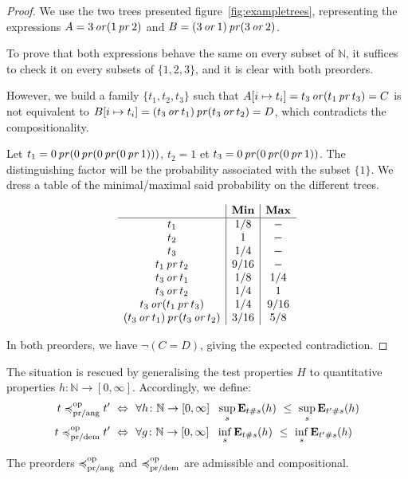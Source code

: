 \begin{proof}
    We use the two trees presented figure~\ref{fig:exampletrees},
    representing the expressions $A = 3 \operatorname{\mathit{or}} (1 \operatorname{\mathit{pr}} 2)$
    and $B = (3 \operatorname{\mathit{or}} 1) \operatorname{\mathit{pr}} (3 \operatorname{\mathit{or}} 2)$.

    To prove that both expressions behave the same on every subset of $\mathbb{N}$,
    it suffices to check it on every subsets of $\{ 1, 2, 3\}$, and it is clear
    with both preorders.

    However, we build a family $\{ t_1, t_2, t_3\}$ such that 
    $A[ i \mapsto t_i] = t_3 \operatorname{\mathit{or}} (t_1 \operatorname{\mathit{pr}} t_3) = C$ is not equivalent to 
    $B[ i\mapsto t_i] = (t_3 \operatorname{\mathit{or}} t_1) \operatorname{\mathit{pr}} (t_3 \operatorname{\mathit{or}} t_2) = D$,
    which contradicts the compositionality.

    Let $t_1 = 0 \operatorname{\mathit{pr}} (0 \operatorname{\mathit{pr}} (0 \operatorname{\mathit{pr}} (0 \operatorname{\mathit{pr}} 1)))$,
    $t_2 = 1$ et $t_3 = 0 \operatorname{\mathit{pr}} (0 \operatorname{\mathit{pr}} (0 \operatorname{\mathit{pr}} 1))$. The distinguishing 
    factor will be the probability associated with the subset $\{ 1 \}$.
    We dress a table of the minimal/maximal said probability on the different 
    trees.


    \begin{equation*}
        \begin{array}{c|c|c}
                & \textbf{Min} & \textbf{Max} \\ \hline
            t_1 & 1/8 & - \\
            t_2 & 1   & -   \\
            t_3 & 1/4 & - \\
            t_1 \operatorname{\mathit{pr}} t_2 & 9 / 16 & - \\
            t_3 \operatorname{\mathit{or}} t_1 & 1/8    & 1/4 \\
            t_3 \operatorname{\mathit{or}} t_2 & 1/4    & 1   \\
            t_3 \operatorname{\mathit{or}} (t_1 \operatorname{\mathit{pr}} t_3) & 1/4 & 9/16 \\
            (t_3 \operatorname{\mathit{or}} t_1) \operatorname{\mathit{pr}} (t_3 \operatorname{\mathit{or}} t_2) & 3 / 16 & 5/8 \\
        \end{array}
    \end{equation*}

    In both preorders, we have $\neg (C = D)$,
    giving the expected contradiction.
\end{proof}

The situation is rescued by generalising the test properties $H$ to 
quantitative properties $h \colon \mathbb{N} \to [0,\infty]$. 
Accordingly, we define:
\begin{align*}
t \preccurlyeq^{\text{op}}_{\text{pr/ang}} t' ~ \Leftrightarrow ~ ~& \forall h \colon \mathbb{N} \to [0,\infty]~~ \sup_s  \mathbf{E}_{t\#s} (h)~ \leq~ \sup_s \mathbf{E}_{t'\#s} (h)
\\
t \preccurlyeq^{\text{op}}_{\text{pr/dem}} t' ~ \Leftrightarrow ~ ~& \forall g \colon \mathbb{N} \to [0,\infty]~~ \inf_s  \mathbf{E}_{t\#s} (h)~ \leq~ \inf_s \mathbf{E}_{t'\#s} (h)
\end{align*}
\begin{proposition}
The preorders $\preccurlyeq^{\text{op}}_{\text{pr/ang}}$ and $\preccurlyeq^{\text{op}}_{\text{pr/dem}}$ are admissible and compositional.
\end{proposition}


